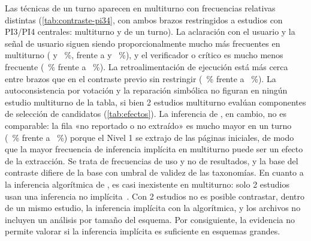 Las técnicas de un turno aparecen en multiturno con frecuencias relativas distintas (\cref{tab:contraste-pi34}, con ambos brazos restringidos a estudios con PI3/PI4 centrales: \nCentralMT{} multiturno y \nCentralUT{} de un turno). La aclaración con el usuario y la señal de usuario siguen siendo proporcionalmente mucho más frecuentes en multiturno (\ctMecAclaracionUsuarioMT{} y \ctSenalUsuarioMT{}~\%, frente a \ctMecAclaracionUsuarioUT{} y \ctSenalUsuarioUT{}~\%), y el verificador o crítico es mucho menos frecuente (\ctMecVerificadorCriticoMT{}~\% frente a \ctMecVerificadorCriticoUT{}~\%). La retroalimentación de ejecución está más cerca entre brazos que en el contraste previo sin restringir (\ctMecEjecucionFeedbackErroresMT{}~\% frente a \ctMecEjecucionFeedbackErroresUT{}~\%). La autoconsistencia por votación y la reparación simbólica no figuran en ningún estudio multiturno de la tabla, si bien 2 estudios multiturno evalúan componentes de selección de candidatos (\cref{tab:efectos}). La inferencia de , en cambio, no es comparable: la fila «no reportado o no extraído» es mucho mayor en un turno (\ctJoinsNrUT{}~\% frente a \ctJoinsNrMT{}~\%) porque el Nivel 1 se extrajo de las páginas iniciales, de modo que la mayor frecuencia de inferencia implícita en multiturno puede ser un efecto de la extracción. Se trata de frecuencias de uso y no de resultados, y la base del contraste difiere de la base con umbral de validez de las taxonomías. En cuanto a la inferencia algorítmica de , es casi inexistente en multiturno: solo 2 estudios usan una inferencia no implícita~\cite{Dou2023UniSAr,Wang2020PGGSQL}. Con 2 estudios no es posible contrastar, dentro de un mismo estudio, la inferencia implícita con la algorítmica, y los archivos no incluyen un análisis por tamaño del esquema. Por consiguiente, la evidencia no permite valorar si la inferencia implícita es suficiente en esquemas grandes.

